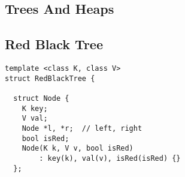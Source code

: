 \documentclass[twoside]{article}
\begin{document}
\begin{multicols*}{2}
\sectionfont{\bfseries\sffamily\centering\Huge}
\vspace{1em}
\section*{Trees And Heaps}
\vspace{3em}
\subsectionfont{\large\bfseries\sffamily\underline}
\subsection*{Red Black Tree}
\begin{verbatim}
template <class K, class V>
struct RedBlackTree {

  struct Node {
    K key;
    V val;
    Node *l, *r;  // left, right
    bool isRed;
    Node(K k, V v, bool isRed)
        : key(k), val(v), isRed(isRed) {}
  };


\end{verbatim}
\end{multicols*}
\end{document}
